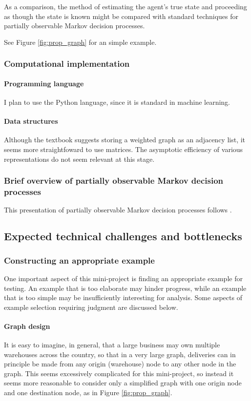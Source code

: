 As a comparison, the method of estimating the agent's true state and proceeding as though the state is known might be compared with standard techniques for partially observable Markov decision processes.

See Figure \ref{fig:prop_graph} for an simple example.

\subsubsection{Computational implementation}

\paragraph{Programming language} I plan to use the Python language, since it is standard in machine learning.

\paragraph{Data structures} Although the textbook \cite[Ch. 20]{clrs} suggests storing a weighted graph as an adjacency list, it seems more straightfoward to use matrices. The asymptotic efficiency of various representations do not seem relevant at this stage.

\subsubsection{Brief overview of partially observable Markov decision processes} This presentation of partially observable Markov decision processes follows \cite[Ch. 12]{rl_sota}.

\subsection{Expected technical challenges and bottlenecks}

\subsubsection{Constructing an appropriate example}

One important aspect of this mini-project is finding an appropriate example for testing. An example that is too elaborate may hinder progress, while an example that is too simple may be insufficiently interesting for analysis. Some aspects of example selection requiring judgment are discussed below.

\paragraph{Graph design} It is easy to imagine, in general, that a large business may own multiple warehouses across the country, so that in a very large graph, deliveries can in principle be made from any origin (warehouse) node to any other node in the graph. This seems excessively complicated for this mini-project, so instead it seems more reasonable to consider only a simplified graph with one origin node and one destination node, as in Figure \ref{fig:prop_graph}.

